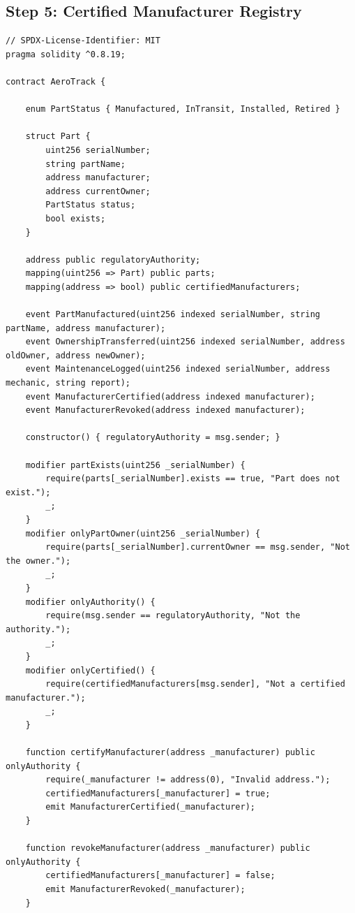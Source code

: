 \documentclass[12pt,a4paper]{article}
\begin{document}
\subsection{Step 5: Certified Manufacturer Registry}

\begin{lstlisting}[caption={Step5\_Enhancement.sol -- Adds certification system}]
// SPDX-License-Identifier: MIT
pragma solidity ^0.8.19;

contract AeroTrack {

    enum PartStatus { Manufactured, InTransit, Installed, Retired }

    struct Part {
        uint256 serialNumber;
        string partName;
        address manufacturer;
        address currentOwner;
        PartStatus status;
        bool exists;
    }

    address public regulatoryAuthority;
    mapping(uint256 => Part) public parts;
    mapping(address => bool) public certifiedManufacturers;

    event PartManufactured(uint256 indexed serialNumber, string partName, address manufacturer);
    event OwnershipTransferred(uint256 indexed serialNumber, address oldOwner, address newOwner);
    event MaintenanceLogged(uint256 indexed serialNumber, address mechanic, string report);
    event ManufacturerCertified(address indexed manufacturer);
    event ManufacturerRevoked(address indexed manufacturer);

    constructor() { regulatoryAuthority = msg.sender; }

    modifier partExists(uint256 _serialNumber) {
        require(parts[_serialNumber].exists == true, "Part does not exist.");
        _;
    }
    modifier onlyPartOwner(uint256 _serialNumber) {
        require(parts[_serialNumber].currentOwner == msg.sender, "Not the owner.");
        _;
    }
    modifier onlyAuthority() {
        require(msg.sender == regulatoryAuthority, "Not the authority.");
        _;
    }
    modifier onlyCertified() {
        require(certifiedManufacturers[msg.sender], "Not a certified manufacturer.");
        _;
    }

    function certifyManufacturer(address _manufacturer) public onlyAuthority {
        require(_manufacturer != address(0), "Invalid address.");
        certifiedManufacturers[_manufacturer] = true;
        emit ManufacturerCertified(_manufacturer);
    }

    function revokeManufacturer(address _manufacturer) public onlyAuthority {
        certifiedManufacturers[_manufacturer] = false;
        emit ManufacturerRevoked(_manufacturer);
    }


\end{lstlisting}
\end{document}
